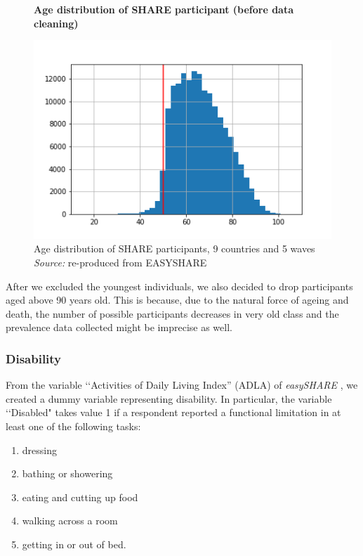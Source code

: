 \begin{figure}[H] 
    \centering \textbf{Age distribution of SHARE participant (before data cleaning)}\par\medskip
    \includegraphics[scale=.5]{images/age_distribution.png}
    \captionsetup{justification=centering}
    \caption{Age distribution of SHARE participants, 9 countries and 5 waves \\ \textit{Source:} re-produced from EASYSHARE}
\label{fig:age_distribution}
\end{figure}


After we excluded the youngest individuals, we also decided to drop participants aged above 90 years old. This is because, due to the natural force of ageing and death, the number of possible participants decreases in very old class and the prevalence data collected might be imprecise as well.\\


\subsubsection{Disability}
From the variable \lq\lq Activities of Daily Living Index'' (ADLA)  of \textit{easySHARE} , we created a  dummy variable representing disability.  In particular,  the variable \lq\lq Disabled" takes value 1 if a respondent reported a functional limitation in at least one of the following tasks: 
\begin{enumerate}
\item dressing
\item bathing or showering
\item eating and cutting up food
\item walking across a room
\item getting in or out of bed.
\end{enumerate}

